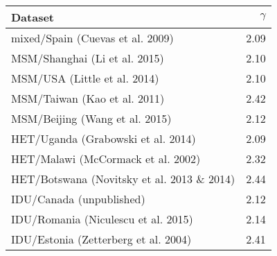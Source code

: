 \begin{tabular}{lr}
  \hline
Dataset & $\gamma$ \\ 
  \hline
mixed/Spain (Cuevas et al. 2009) & 2.09 \\ 
  MSM/Shanghai (Li et al. 2015) & 2.10 \\ 
  MSM/USA (Little et al. 2014) & 2.10 \\ 
  MSM/Taiwan (Kao et al. 2011) & 2.42 \\ 
  MSM/Beijing (Wang et al. 2015) & 2.12 \\ 
  HET/Uganda (Grabowski et al. 2014) & 2.09 \\ 
  HET/Malawi (McCormack et al. 2002) & 2.32 \\ 
  HET/Botswana (Novitsky et al. 2013 \& 2014) & 2.44 \\ 
  IDU/Canada (unpublished) & 2.12 \\ 
  IDU/Romania (Niculescu et al. 2015) & 2.14 \\ 
  IDU/Estonia (Zetterberg et al. 2004) & 2.41 \\ 
   \hline
\end{tabular}
